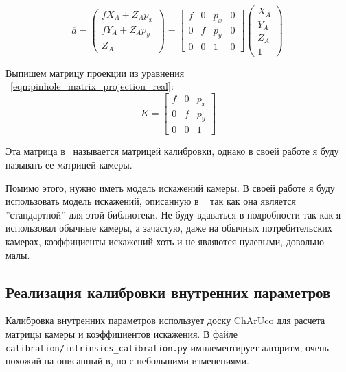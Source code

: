 \documentclass[12pt, a4paper]{article}
\begin{document}
\begin{equation}
    \overline{a} = \begin{pmatrix}
        fX_A + Z_A p_x\\
        fY_A + Z_A p_y\\
        Z_A
    \end{pmatrix} = \begin{bmatrix}
        f & 0 & p_x & 0 \\
        0 & f & p_y & 0 \\
        0 & 0 & 1 & 0
    \end{bmatrix} \begin{pmatrix}
        X_A\\
        Y_A\\
        Z_A\\
        1
    \end{pmatrix}
~\label{eqn:pinhole_matrix_projection_real}
\end{equation}

Выпишем матрицу проекции из уравнения ~\eqref{eqn:pinhole_matrix_projection_real}:
\begin{equation}
    K = \begin{bmatrix}
        f & 0 & p_x\\
        0 & f & p_y\\
        0 & 0 & 1
    \end{bmatrix}
\end{equation}

Эта матрица в~\cite{multiview_cv} называется матрицей калибровки, однако в своей
работе я буду называть ее матрицей камеры. 

Помимо этого, нужно иметь модель искажений камеры.
В своей работе я буду использовать модель искажений, описанную в
~\cite{opencv_calibration_tutorial} так как она является ''стандартной'' для этой
библиотеки.  Не буду вдаваться в подробности так как я использовал обычные
камеры, а зачастую, даже на обычных потребительских камерах, коэффициенты
искажений хоть и не являются нулевыми, довольно малы.

\subsection{Реализация калибровки внутренних параметров}
\label{sec:camera_intrinsics_calibration}
Калибровка внутренних параметров использует доску ChArUco для расчета матрицы
камеры и коэффициентов искажения. В файле
\texttt{calibration/intrinsics\_calibration.py} имплементирует алгоритм, очень
похожий на описанный в\cite{opencv_calibration_tutorial}, но с небольшими
изменениями.
\end{document}
